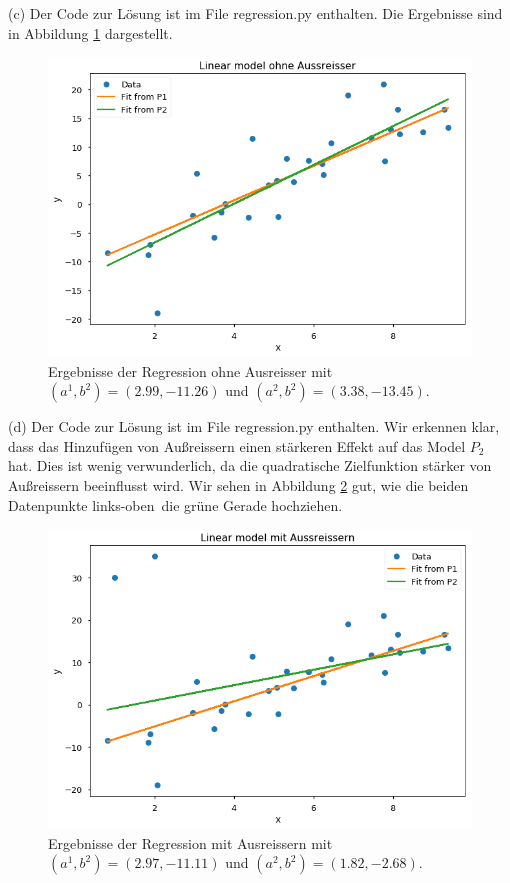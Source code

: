 \documentclass[ngerman, a4paper,12pt]{article}
\begin{document}
(c) Der Code zur Lösung ist im File regression.py enthalten. Die Ergebnisse sind in Abbildung \ref{fig:21c} dargestellt.
\begin{figure}[h]
	\centering
	\includegraphics[width=0.8\columnwidth]{21c.png}
	\caption{\label{fig:21c} Ergebnisse der Regression ohne Ausreisser mit $(a^1, b^2) = (2.99, -11.26)$ und $(a^2, b^2) = (3.38, -13.45)$.}
\end{figure}
\par
(d) Der Code zur Lösung ist im File regression.py enthalten. Wir erkennen klar, dass das Hinzufügen von Außreissern einen stärkeren Effekt auf das Model $P_2$ hat. Dies ist wenig verwunderlich, da die quadratische Zielfunktion stärker von Außreissern beeinflusst wird. Wir sehen in Abbildung \ref{fig:21d} gut, wie die beiden Datenpunkte \glqq links-oben\grqq \ die grüne Gerade \glqq hochziehen\grqq. \par
\begin{figure}[h]
	\centering
	\includegraphics[width=0.8\columnwidth]{21d.png}
	\caption{\label{fig:21d} Ergebnisse der Regression mit Ausreissern mit $(a^1, b^2) = (2.97, -11.11)$ und $(a^2, b^2) = (1.82, -2.68)$.}
\end{figure}
\end{document}
